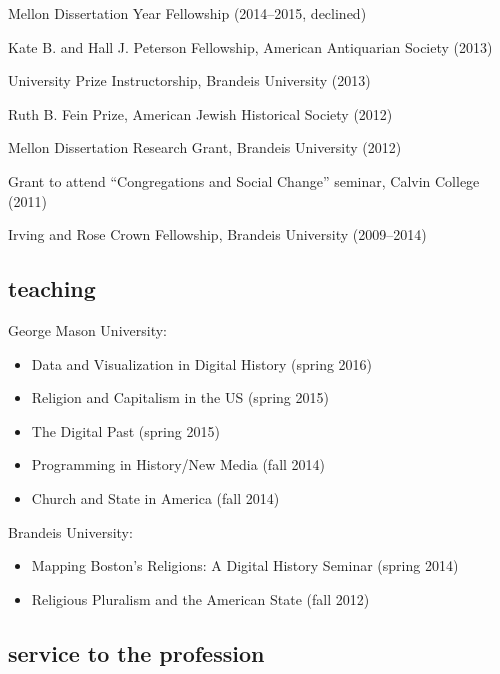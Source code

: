 \documentclass[11pt]{article}
\providecommand{\tightlist}{%
  \setlength{\itemsep}{0pt}\setlength{\parskip}{0pt}}
\begin{document}
Mellon Dissertation Year Fellowship (2014--2015, declined)

Kate B. and Hall J. Peterson Fellowship, American Antiquarian Society
(2013)

University Prize Instructorship, Brandeis University (2013)

Ruth B. Fein Prize, American Jewish Historical Society (2012)

Mellon Dissertation Research Grant, Brandeis University (2012)

Grant to attend ``Congregations and Social Change'' seminar, Calvin
College (2011)

Irving and Rose Crown Fellowship, Brandeis University (2009--2014)

\subsection{teaching}\label{teaching}

George Mason University:

\vspace{-0.2in}

\begin{itemize}
    \tightlist
  \item Data and Visualization in Digital History (spring 2016)
  \item Religion and Capitalism in the US (spring 2015) 
  \item The Digital Past (spring 2015)
  \item Programming in History/New Media (fall 2014) 
  \item Church and State in America (fall 2014)
\end{itemize}

\vspace{-0.1in}

Brandeis University:

\vspace{-0.2in}

\begin{itemize}
    \tightlist
  \item
    Mapping Boston's Religions: A Digital History Seminar (spring 2014)
  \item
    Religious Pluralism and the American State (fall 2012)
\end{itemize}

\subsection{service to the profession}\label{service-profession}
\end{document}
